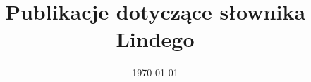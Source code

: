 \documentclass{article}
\title{Publikacje dotyczące słownika Lindego}
\date{\today}
\begin{document}
\maketitle{}
\nocite{*}

\printbibliography
\end{document}
